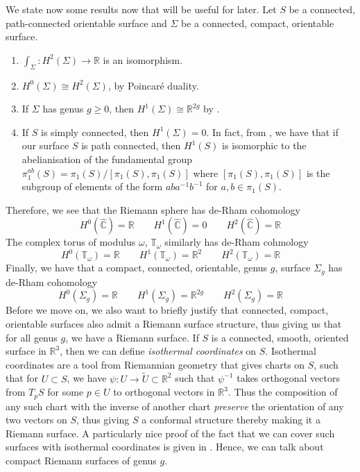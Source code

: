 \documentclass[11pt]{report}
\theoremstyle{definition}
\begin{document}
We state now some results now that will be useful for later. Let $S$ be a connected, path-connected orientable surface and $\Sigma$ be a connected, compact, orientable surface.
\begin{enumerate}
  \item $\int_{\Sigma} :H^2(\Sigma) \rightarrow \mathbb{R}$ is an isomorphism. \cite[Corollary 10.14]{calcohomo}
  \item $H^0(\Sigma)\cong H^2(\Sigma)$, by Poincar\'{e} duality.
  \item If $\Sigma$ has genus $g \geq 0$, then $H^1(\Sigma) \cong \mathbb{R}^{2g}$ by \cite[p.69]{donaldson}.
  \item If $S$ is simply connected, then $H^1(\Sigma) = 0$. In fact, from \cite[Theorem 2A.1]{Hatchers}, we have that if our surface $S$ is path connected, then $H^1(S)$ is isomorphic to the abelianisation of the fundamental group $\pi_1^{ab}(S) = \pi_1(S)/[\pi_1(S),\pi_1(S)]$ where $[\pi_1(S),\pi_1(S)]$ is the subgroup of elements of the form $aba^{-1}b^{-1}$ for $a,b \in \pi_1(S)$. 
\end{enumerate}
Therefore, we see that the Riemann sphere has de-Rham cohomology
\[
  H^0(\widehat{\mathbb{C}}) = \mathbb{R} \qquad 
  H^1(\widehat{\mathbb{C}}) = 0 \qquad 
  H^2(\widehat{\mathbb{C}}) = \mathbb{R}
\]
 The complex torus of modulus $\omega$, $\mathbb{T_\omega}$ similarly has de-Rham cohmology
\[
   H^0(\mathbb{T_\omega}) = \mathbb{R} \qquad
   H^1(\mathbb{T_\omega}) = \mathbb{R}^2 \qquad
   H^2(\mathbb{T_\omega}) = \mathbb{R} \qquad
\]
Finally, we have that a compact, connected, orientable, genus $g$, surface $\Sigma_g$ has de-Rham cohomology
\[
   H^0(\Sigma_g) = \mathbb{R} \qquad
   H^1(\Sigma_g) = \mathbb{R}^{2g} \qquad
   H^2(\Sigma_g) = \mathbb{R} \qquad
\]
Before we move on, we also want to briefly justify that connected, compact, orientable surfaces also admit a Riemann surface structure, thus giving us that for all genus $g$, we have a Riemann surface. If $S$ is a connected, smooth, oriented surface in $\mathbb{R}^3$, then we can define \emph{isothermal coordinates} on $S$. Isothermal coordinates are a tool from Riemannian geometry that gives charts on $S$, such that for $U \subset S$, we have $\psi : U \rightarrow \tilde{U} \subset \mathbb{R}^2$ such that $\psi^{-1}$ takes orthogonal vectors from $T_pS$ for some $p \in U$ to orthogonal vectors in $\mathbb{R}^3$. Thus the composition of any such chart with the inverse of another chart \emph{preserve} the orientation of any two vectors on $S$, thus giving $S$ a conformal structure thereby making it a Riemann surface. A particularly nice proof of the fact that we can cover such surfaces with isothermal coordinates is given in \cite{chern}. Hence, we can talk about compact Riemann surfaces of genus $g$. 
\end{document}
